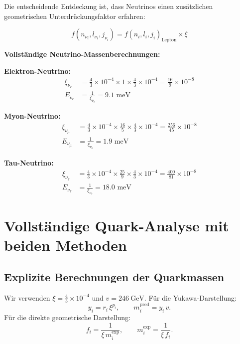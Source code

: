 Die entscheidende Entdeckung ist, dass Neutrinos einen zusätzlichen geometrischen Unterdrückungsfaktor erfahren:

\begin{equation}
	f(n_{\nu_i}, l_{\nu_i}, j_{\nu_i}) = f(n_i, l_i, j_i)_{\text{Lepton}} \times \xi
	\label{eq:neutrino_suppression}
\end{equation}

\textbf{Vollständige Neutrino-Massenberechnungen:}

\textbf{Elektron-Neutrino:}
\begin{align}
	\xi_{\nu_e} &= \frac{4}{3} \times 10^{-4} \times 1 \times \frac{4}{3} \times 10^{-4} = \frac{16}{9} \times 10^{-8} \\
	E_{\nu_e} &= \frac{1}{\xi_{\nu_e}} = 9.1 \text{ meV}
\end{align}

\textbf{Myon-Neutrino:}
\begin{align}
	\xi_{\nu_\mu} &= \frac{4}{3} \times 10^{-4} \times \frac{16}{5} \times \frac{4}{3} \times 10^{-4} = \frac{256}{45} \times 10^{-8} \\
	E_{\nu_\mu} &= \frac{1}{\xi_{\nu_\mu}} = 1.9 \text{ meV}
\end{align}

\textbf{Tau-Neutrino:}
\begin{align}
	\xi_{\nu_\tau} &= \frac{4}{3} \times 10^{-4} \times \frac{25}{9} \times \frac{4}{3} \times 10^{-4} = \frac{400}{81} \times 10^{-8} \\
	E_{\nu_\tau} &= \frac{1}{\xi_{\nu_\tau}} = 18.0 \text{ meV}
\end{align}

\section{Vollständige Quark-Analyse mit beiden Methoden}
\label{sec:quark_analysis}

\subsection{Explizite Berechnungen der Quarkmassen}
\label{subsec:quark_calculations}

Wir verwenden $\xi=\tfrac{4}{3}\times10^{-4}$ und $v=246\ \mathrm{GeV}$.
Für die Yukawa-Darstellung:
\[
y_i = r_i\,\xi^{p_i},\qquad m_i^{\text{pred}}=y_i\,v.
\]
Für die direkte geometrische Darstellung:
\[
f_i=\frac{1}{\xi\, m_i^{\text{exp}}},\qquad m_i^{\text{exp}}=\frac{1}{\xi\, f_i}.
\]


